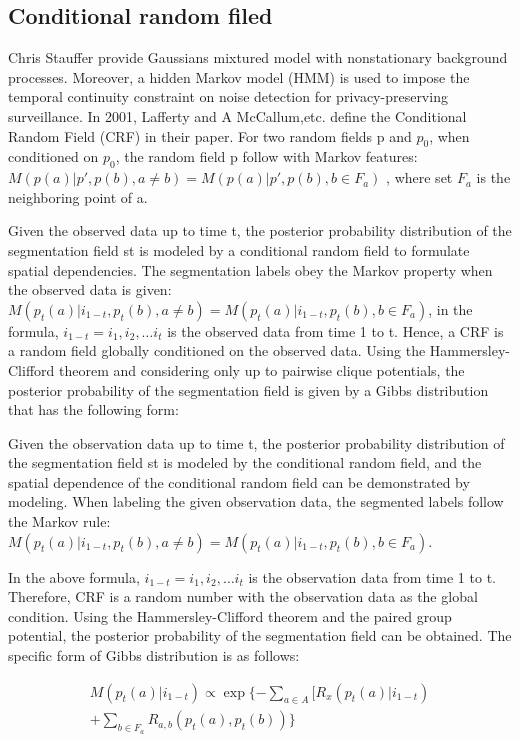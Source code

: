 \documentclass[journal,transmag]{IEEEtran}
\begin{document}
\subsection{Conditional random filed}
Chris Stauffer provide Gaussians mixtured model with nonstationary background processes. Moreover, a hidden Markov model (HMM) is used to impose the temporal continuity constraint on noise detection for privacy-preserving surveillance. In 2001, Lafferty and A McCallum,etc. define the Conditional Random Field (CRF) in their paper.  For two random fields p and $p_0$, when conditioned on $p_0$, the random field p follow with Markov features:$M(p(a)|p',p(b),a \ne b)= M(p(a)|p',p(b),b\in F_a)$ , where set $F_a$ is the neighboring point of a.

Given the observed data up to time t, the posterior probability distribution of the segmentation field st is modeled by a conditional random field to formulate spatial dependencies. The segmentation labels obey the Markov property when the observed data is given: $M(p_t(a)|i_{1-t},p_t(b),a \ne b)= M(p_t(a)|i_{1-t},p_t(b),b\in F_a)$, in the formula,  $i_{1-t} = {i_1,i_2,\dots i_t}$ is the observed data from time 1 to t. Hence, a CRF is a random field globally conditioned on the observed data. Using the Hammersley-Clifford theorem and considering only up to pairwise clique potentials, the posterior probability of the segmentation field is given by a Gibbs distribution that has the following form:

Given the observation data up to time t, the posterior probability distribution of the segmentation field st is modeled by the conditional random field, and the spatial dependence of the conditional random field can be demonstrated by modeling. When labeling the given observation data, the segmented labels follow the Markov rule: $M(p_t(a)|i_{1-t},p_t(b),a \ne b)= M(p_t(a)|i_{1-t},p_t(b),b\in F_a)$. 

In the above formula, $i_{1-t} = {i_1,i_2,\dots i_t}$ is the observation data from time 1 to t. Therefore, CRF is a random number with the observation data as the global condition. Using the Hammersley-Clifford theorem and the paired group potential, the posterior probability of the segmentation field can be obtained. The specific form of Gibbs distribution is as follows:

\begin{equation} \label{eq:crf1}
\begin{aligned}
    M(p_t(a)|i_{1-t}) \propto \exp \{ - \sum_{a\in A}[R_x ( p_t (a)|i_{1-t}) \\
    +\sum_{b \in F_a} R_{a,b}(p_t(a),p_t(b)) \}
    \end{aligned}
\end{equation}
\end{document}
